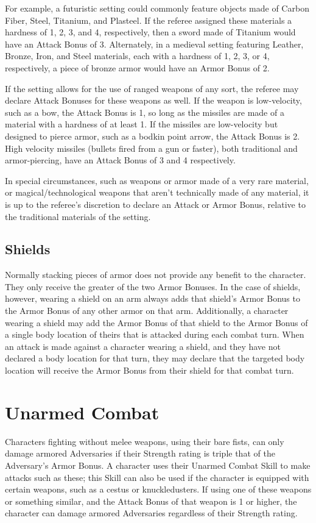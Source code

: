 \documentclass[oneside]{book}
\begin{document}
\begin{multicols}{2}
For example, a futuristic setting could commonly feature objects made of Carbon Fiber, Steel, Titanium, and Plasteel. If the referee assigned these materials a hardness of 1, 2, 3, and 4, respectively, then a sword made of Titanium would have an Attack Bonus of 3. Alternately, in a medieval setting featuring Leather, Bronze, Iron, and Steel materials, each with a hardness of 1, 2, 3, or 4, respectively, a piece of bronze armor would have an Armor Bonus of 2. 

If the setting allows for the use of ranged weapons of any sort, the referee may declare Attack Bonuses for these weapons as well. If the weapon is low-velocity, such as a bow, the Attack Bonus is 1, so long as the missiles are made of a material with a hardness of at least 1. If the missiles are low-velocity but designed to pierce armor, such as a bodkin point arrow, the Attack Bonus is 2. High velocity missiles (bullets fired from a gun or faster), both traditional and armor-piercing, have an Attack Bonus of 3 and 4 respectively. 

In special circumstances, such as weapons or armor made of a very rare material, or magical/technological weapons that aren't technically made of any material, it is up to the referee's discretion to declare an Attack or Armor Bonus, relative to the traditional materials of the setting. 

\subsection{Shields}
Normally stacking pieces of armor does not provide any benefit to the character. They only receive the greater of the two Armor Bonuses. In the case of shields, however, wearing a shield on an arm always adds that shield's Armor Bonus to the Armor Bonus of any other armor on that arm. Additionally, a character wearing a shield may add the Armor Bonus of that shield to the Armor Bonus of a single body location of theirs that is attacked during each combat turn. When an attack is made against a character wearing a shield, and they have not declared a body location for that turn, they may declare that the targeted body location will receive the Armor Bonus from their shield for that combat turn. 

\section{Unarmed Combat}
Characters fighting without melee weapons, using their bare fists, can only damage armored Adversaries if their Strength rating is triple that of the Adversary's Armor Bonus. A character uses their Unarmed Combat Skill to make attacks such as these; this Skill can also be used if the character is equipped with certain weapons, such as a cestus or knuckledusters. If using one of these weapons or something similar, and the Attack Bonus of that weapon is 1 or higher, the character can damage armored Adversaries regardless of their Strength rating.  


\end{multicols}
\end{document}
